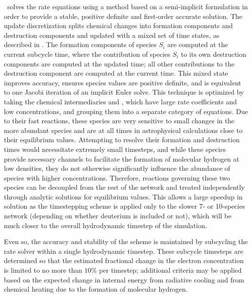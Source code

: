 \enzo\ solves the rate equations using a method based on a semi-implicit
formulation in order to provide a stable, positive definite and first-order
accurate solution.  The update discretization splits chemical changes into
formation components and destruction components and updated with a mixed set of
time states, as described in \citet{anninos97}.  The formation components of
species $S_i$ are computed at the current subcycle time, where the contribution
of species $S_i$ to its own destruction components are computed at the updated
time; all other contributions to the destruction component are computed at the
current time.  This mixed state improves accuracy, ensures species values
are positive definite, and is equivalent to one Jacobi iteration of an implicit
Euler solve.  This technique is optimized by taking the chemical intermediaries
\Hm and \HHp, which have large rate coefficients and low concentrations, and
grouping them into a separate category of equations.  Due to their fast
reactions, these species are very sensitive to small changes in the more
abundant species and are at all times in astrophysical calculations close to
their equilibrium values.  Attempting to resolve their formation and destruction
times would necessitate extremely small timesteps, and while these species
provide necessary channels to facilitate the formation of molecular hydrogen at
low densities, they do not otherwise significantly influence the abundance of
species with higher concentrations.  Therefore, reactions governing these two
species can be decoupled from the rest of the network and treated independently
through analytic solutions for equilibrium values.  This allows a large speedup
in solution as the timestepping scheme is applied only to the slower 7- or
10-species network (depending on whether deuterium is included or not), which
will be much closer to the overall hydrodynamic timestep of the simulation.

Even so, the accuracy and stability of the scheme is maintained by subcycling
the rate solver within a single hydrodynamic timestep.  These subcycle
timesteps are determined so that the estimated fractional change in the
electron concentration is limited to no more than $10\%$ per timestep;
additional criteria may be applied based on the expected change in
internal energy from radiative
cooling and from  chemical heating due to the formation of molecular hydrogen.

